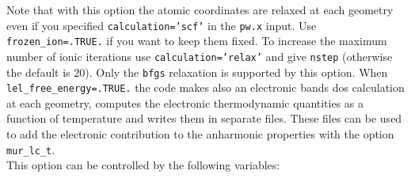 \documentclass[12pt,a4paper,twoside]{report}
\begin{document}
Note that with this option the atomic coordinates are relaxed at each
geometry even if you specified \texttt{calculation='scf'} in the 
\texttt{pw.x} input. Use \texttt{frozen\_ion=.TRUE.} if you want to keep
them fixed. To increase the maximum number of ionic iterations use
\texttt{calculation='relax'} and give \texttt{nstep} (otherwise the default 
is $20$). Only the \texttt{bfgs} relaxation is supported by this
option.
When \texttt{lel\_free\_energy=.TRUE.} the code makes also an electronic bands
dos calculation at each geometry, computes the electronic thermodynamic
quantities as a function of temperature and writes them in separate files.
These files can be used to add the electronic contribution to the
anharmonic properties with the option \texttt{mur\_lc\_t}.\\
This option can be controlled by the following variables:
\end{document}
